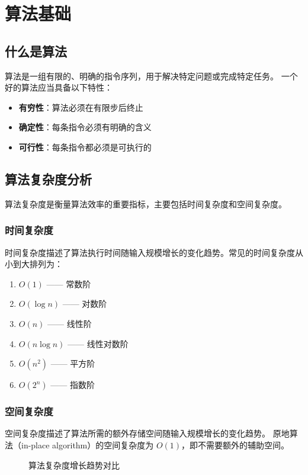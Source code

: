 \chapter{算法基础}

\section{什么是算法}

算法是一组有限的、明确的指令序列，用于解决特定问题或完成特定任务。
一个好的算法应当具备以下特性：

\begin{itemize}
    \item \textbf{有穷性}：算法必须在有限步后终止
    \item \textbf{确定性}：每条指令必须有明确的含义
    \item \textbf{可行性}：每条指令都必须是可执行的
\end{itemize}

\section{算法复杂度分析}

算法复杂度是衡量算法效率的重要指标，主要包括时间复杂度和空间复杂度。

\subsection{时间复杂度}

时间复杂度描述了算法执行时间随输入规模增长的变化趋势。常见的时间复杂度从小到大排列为：

\begin{enumerate}
    \item $O(1)$ —— 常数阶
    \item $O(\log n)$ —— 对数阶
    \item $O(n)$ —— 线性阶
    \item $O(n\log n)$ —— 线性对数阶
    \item $O(n^2)$ —— 平方阶
    \item $O(2^n)$ —— 指数阶
\end{enumerate}

\subsection{空间复杂度}

空间复杂度描述了算法所需的额外存储空间随输入规模增长的变化趋势。
原地算法（in-place algorithm）的空间复杂度为 $O(1)$，即不需要额外的辅助空间。

\begin{figure}[htbp]
    \centering
    \caption{算法复杂度增长趋势对比}
    \label{fig:complexity}
\end{figure}
